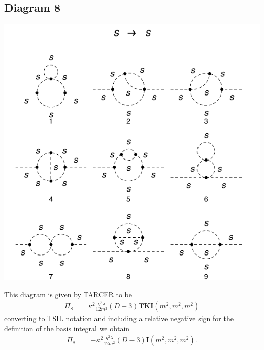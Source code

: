 \documentclass[11pt]{article}
\newcommand{\tsil}{\textsf{TSIL} }
\newcommand{\tarcer}{\textsf{TARCER} }
\begin{document}
\subsection*{Diagram 8}
\noindent\begin{minipage}{0.3\textwidth}
\begin{center}
\includegraphics{2loop_8.pdf}
\end{center}
\end{minipage}
\noindent\begin{minipage}{0.7\textwidth}
This diagram is given by \tarcer to be
\begin{align}
\Pi_8 & =  \kappa^2\frac{g^2 \lambda}{12 m^2 } (D-3) \mathbf{TKI}(m^2,m^2,m^2)
\end{align}
converting to \tsil notation and including a relative negative sign for the definition of the basis integral we obtain
\begin{align}
\Pi_8 & =  -\kappa^2\frac{g^2 \lambda}{12 m^2 } (D-3) \mathbf{I}(m^2,m^2,m^2).
\end{align}
\end{minipage}
\end{document}
